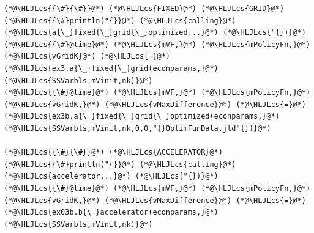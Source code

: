 \documentclass[12pt,a4paper]{article}
\newcommand{\HLJLcs}[1]{\textcolor[RGB]{153,153,119}{\textit{#1}}}
\begin{document}
\begin{lstlisting}
(*@\HLJLcs{{\#}{\#}}@*) (*@\HLJLcs{FIXED}@*) (*@\HLJLcs{GRID}@*)
(*@\HLJLcs{{\#}println("{}}@*) (*@\HLJLcs{calling}@*) (*@\HLJLcs{a{\_}fixed{\_}grid{\_}optimized...}@*) (*@\HLJLcs{"{})}@*)
(*@\HLJLcs{{\#}@time}@*) (*@\HLJLcs{mVF,}@*) (*@\HLJLcs{mPolicyFn,}@*) (*@\HLJLcs{vGridK}@*) (*@\HLJLcs{=}@*) (*@\HLJLcs{ex3.a{\_}fixed{\_}grid(econparams,}@*) (*@\HLJLcs{SSVarbls,mVinit,nk)}@*)
(*@\HLJLcs{{\#}@time}@*) (*@\HLJLcs{mVF,}@*) (*@\HLJLcs{mPolicyFn,}@*) (*@\HLJLcs{vGridK,}@*) (*@\HLJLcs{vMaxDifference}@*) (*@\HLJLcs{=}@*) (*@\HLJLcs{ex3b.a{\_}fixed{\_}grid{\_}optimized(econparams,}@*) (*@\HLJLcs{SSVarbls,mVinit,nk,0,0,"{}OptimFunData.jld"{})}@*)

(*@\HLJLcs{{\#}{\#}}@*) (*@\HLJLcs{ACCELERATOR}@*)
(*@\HLJLcs{{\#}println("{}}@*) (*@\HLJLcs{calling}@*) (*@\HLJLcs{accelerator...}@*) (*@\HLJLcs{"{})}@*)
(*@\HLJLcs{{\#}@time}@*) (*@\HLJLcs{mVF,}@*) (*@\HLJLcs{mPolicyFn,}@*) (*@\HLJLcs{vGridK,}@*) (*@\HLJLcs{vMaxDifference}@*) (*@\HLJLcs{=}@*) (*@\HLJLcs{ex03b.b{\_}accelerator(econparams,}@*) (*@\HLJLcs{SSVarbls,mVinit,nk)}@*)


\end{lstlisting}
\end{document}

